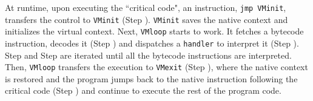 At runtime, upon executing the ``critical code", an instruction, \texttt{jmp VMinit}, transfers the control to \texttt{VMinit} (Step ). \texttt{VMinit} saves the native context and initializes the virtual context. Next, \texttt{VMloop} starts to work. It fetches a bytecode instruction, decodes it (Step ) and dispatches a \texttt{handler} to interpret it (Step ). Step  and Step  are iterated until all the bytecode instructions are interpreted. Then, \texttt{VMloop} transfers the execution to \texttt{VMexit} (Step ), where the native context is restored and the program jumps back to the native instruction following the critical code (Step ) and continue to execute the rest of the program code. 